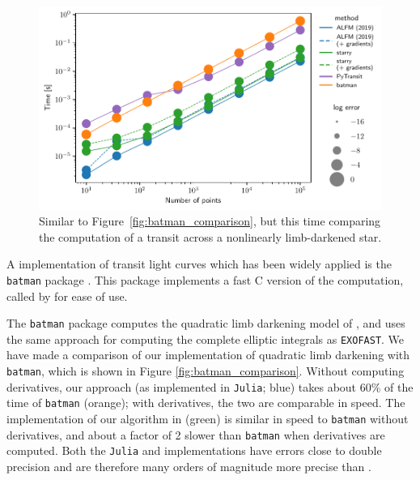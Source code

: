 \documentclass[modern,trackchanges]{aastex63}
\newcommand{\edited}{}
\begin{document}
\begin{figure}[p!]
    \begin{centering}
    \includegraphics[width=0.95\linewidth]{figures/python/compare_to_batman_nonlinear.pdf}
    \caption{Similar to Figure~\ref{fig:batman_comparison}, but this time comparing
             the computation of a transit across a nonlinearly limb-darkened star.
    \label{fig:batman_nonlinear_comparison}}
    \end{centering}
\end{figure}

A \Python implementation of transit light curves which has been widely applied
is the \texttt{batman} package \citep{Kreidberg2015}.  This package
implements a fast C version of the computation, called by \Python for
ease of use.

The \texttt{batman} package computes the quadratic limb darkening model
of \citet{MandelAgol2002}, and uses the same approach for computing
the complete elliptic integrals as \texttt{EXOFAST}.  We have made a comparison
of our implementation of quadratic limb darkening with \texttt{batman},
which is shown in Figure \ref{fig:batman_comparison}.  Without computing
derivatives, our approach (as implemented in \texttt{Julia}; blue)
takes about 60\% of the time of \texttt{batman} (orange);
with derivatives, the two are comparable in speed. The implementation
of our algorithm in \starry (green) is similar in speed to \texttt{batman}
without derivatives, and about a factor of 2 slower than \texttt{batman}
when derivatives are computed. Both the \texttt{Julia} and \starry
implementations have errors close to {\edited double} precision and are therefore
many orders of magnitude more precise than \batman.
\end{document}

